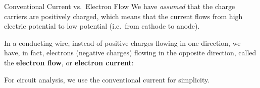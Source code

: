\documentclass[12pt,aspectratio=169]{beamer}
\begin{document}
%
%
%
%  
%
%



\begin{frame}{Conventional Current vs.\ Electron Flow}
  We have \emph{assumed} that the charge carriers are positively charged, which
  means that the current flows from high electric potential to low potential
  (i.e.\ from cathode to anode).
  \begin{center}
  \end{center}
  In a conducting wire, instead of positive charges flowing in one direction,
  we have, in fact, electrons (negative charges) flowing in the opposite
  direction, called the \textbf{electron flow}, or \textbf{electron current}:
  \begin{center}
  \end{center}
  For circuit analysis, we use the conventional current for simplicity.
\end{frame}
\end{document}
